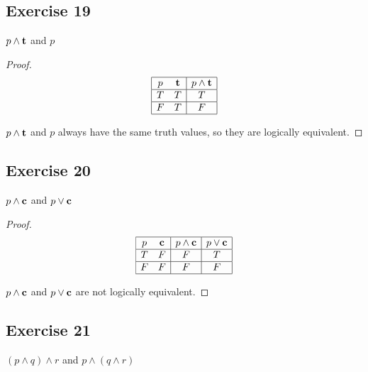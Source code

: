 \documentclass[14pt]{extarticle}
\newcommand{\true}{{\bf t}}
\newcommand{\false}{{\bf c}}
\begin{document}
\subsection{Exercise 19}
$p \wedge \true$ and $p$

\begin{proof}
    $$
        \begin{array}{|cc|c|}
            \hline
            p & \true & p \wedge \true \\
            \hline
            T & T     & T              \\
            \hline
            F & T     & F              \\
            \hline
        \end{array}
    $$

    $p \wedge \true$ and $p$ always have the same truth values, so they are logically equivalent.
\end{proof}

\subsection{Exercise 20}
$p \wedge \false$ and $p \vee \false$

\begin{proof}
    $$
        \begin{array}{|cc|c|c|}
            \hline
            p & \false & p \wedge \false & p \vee \false \\
            \hline
            T & F      & F               & T             \\
            \hline
            F & F      & F               & F             \\
            \hline
        \end{array} $$

    $p \wedge \false$ and $p \vee \false$ are not logically equivalent.
\end{proof}

\subsection{Exercise 21}
$(p \wedge q) \wedge r$ and $p \wedge (q \wedge r)$
\end{document}
